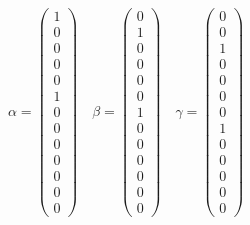 \documentclass{article}
\begin{document}
\begin{center}
    \begin{equation*}
        \alpha=\begin{pmatrix}
            1 \\
            0 \\
            0 \\
            0 \\
            0 \\
            1 \\
            0 \\
            0 \\
            0 \\
            0 \\
            0 \\
            0 \\
            0
\end{pmatrix} \quad
\beta=\begin{pmatrix}
            0 \\
            1 \\
            0 \\
            0 \\
            0 \\
            0 \\
            1 \\
            0 \\
            0 \\
            0 \\
            0 \\
            0 \\
            0      
\end{pmatrix} \quad
\gamma=\begin{pmatrix}
            0 \\
            0 \\
            1 \\
            0 \\
            0 \\
            0 \\
            0 \\
            1 \\
            0 \\
            0 \\
            0 \\
            0 \\
            0       
\end{pmatrix} \quad

\end{equation*}
\end{center}
\end{document}
